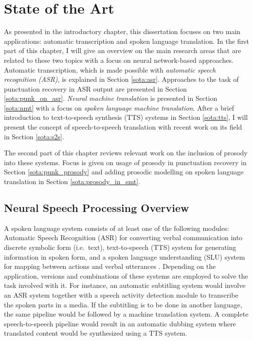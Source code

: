 
\chapter{State of the Art}
\label{chapter:sota}
As presented in the introductory chapter, this dissertation focuses on two main applications: automatic transcription and spoken language translation. In the first part of this chapter, I will give an overview on the main research areas that are related to these two topics with a focus on neural network-based approaches. Automatic transcription, which is made possible with \textit{automatic speech recognition (ASR)}, is explained in Section \ref{sota:asr}. Approaches to the task of punctuation recovery in ASR output are presented in Section \ref{sota:punk_on_asr}. \textit{Neural machine translation} is presented in Section \ref{sota:nmt} with a focus on \textit{spoken language machine translation}. After a brief introduction to text-to-speech synthesis (TTS) systems in Section \ref{sota:tts}, I will present the concept of speech-to-speech translation with recent work on its field in Section \ref{sota:s2s}.

The second part of this chapter reviews relevant work on the inclusion of prosody into these systems. Focus is given on usage of prosody in punctuation recovery in Section \ref{sota:punk_prosody} and adding prosodic modelling on spoken language translation in Section \ref{sota:prosody_in_smt}. 

\section{Neural Speech Processing Overview}

A spoken language system consists of at least one of the following modules: Automatic Speech Recognition (ASR) for converting verbal communication into discrete symbolic form (i.e.~text), text-to-speech (TTS) system for generating information in spoken form, and a spoken language understanding (SLU) system for mapping between actions and verbal utterances \citep{slp_book}. Depending on the application, versions and combinations of these systems are employed to solve the task involved with it. For instance, an automatic subtitling system would involve an ASR system together with a speech activity detection module to transcribe the spoken parts in a media. If the subtitling is to be done in another language, the same pipeline would be followed by a machine translation system. A complete speech-to-speech pipeline would result in an automatic dubbing system where translated content would be synthesized using a TTS system. 

